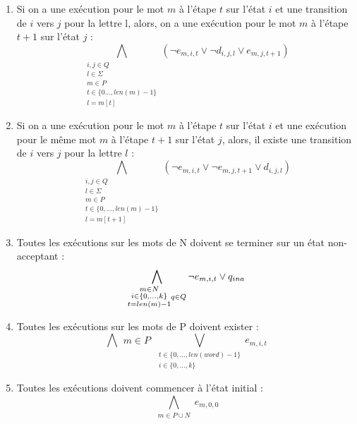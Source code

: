 \documentclass[a4paper, 12pt]{extarticle}
\begin{document}
\begin{enumerate}
    \item Si on a une exécution pour le mot $m$ à l'étape $t$ sur l'état $i$ et une transition de $i$ vers $j$ pour la lettre l,
    alors, on a une exécution pour le mot $m$ à l'étape $t+1$ sur l'état $j$ :
    \begin{equation*}
        \bigwedge_{\substack{i,j \in Q\\l \in \Sigma\\m \in P\\t \in \{0\dots,len(m)-1\}\\l=m[t]}} (\neg e_{m,i,t} \vee \neg d_{i,j,l} \vee e_{m,j,t+1})
    \end{equation*}
    \item Si on a une exécution pour le mot $m$ à l'étape $t$ sur l'état $i$ et une exécution pour le même mot $m$ à l'étape $t+1$ sur l'état $j$,
    alors, il existe une transition de $i$ vers $j$ pour la lettre $l$ :
    \begin{equation*}
        \bigwedge_{\substack{i,j \in Q\\l \in \Sigma\\m \in P\\t \in \{0,\dots,len(m)-1\}\\l=m[t+1]}} (\neg e_{m,i,t} \vee \neg e_{m,j,t+1} \vee d_{i,j,l})
    \end{equation*}
    \item Toutes les exécutions sur les mots de N doivent se terminer sur un état non-acceptant :
    \begin{equation*}
        \bigwedge_{\substack{m \in N\\i \in \{0,\dots,k\}\\t= len(m)-1}\\q\in Q} \neg e_{m,i,t} \vee q_{ina}
    \end{equation*}
    \item Toutes les exécutions sur les mots de P doivent exister :
    \begin{equation*}
        \bigwedge{\substack{m\in P}}\bigvee_{\substack{t\in\{0,\dots,len(word)-1\}\\i\in \{0,\dots,k\}}} e_{m,i,t}
    \end{equation*}
    \item Toutes les exécutions doivent commencer à l'état initial :
    \begin{equation*}
        \bigwedge_{\substack{m\in P\cup N}} e_{m,0,0}
    \end{equation*}
\end{enumerate}





\end{document}

